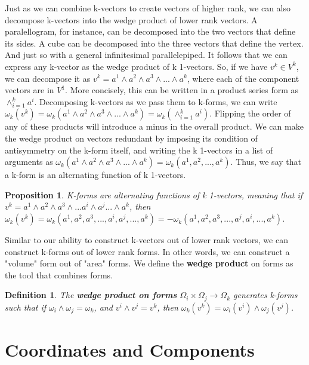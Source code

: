 \documentclass{book}
\newtheorem{defn}[equation]{Definition}
\newtheorem{prop}[equation]{Proposition}
\begin{document}
Just as we can combine k-vectors to create vectors of higher rank, we can also decompose k-vectors into the wedge product of lower rank vectors. A paralellogram, for instance, can be decomposed into the two vectors that define its sides. A cube can be decomposed into the three vectors that define the vertex. And just so with a general infinitesimal parallelepiped. It follows that we can express any k-vector as the wedge product of k 1-vectors. So, if we have $v^k \in V^k$, we can decompose it as $v^k = a^1\wedge a^2 \wedge a^3 \wedge ... \wedge a^k$, where each of the component vectors are in $V^1$. More concisely, this can be written in a product series form as $\wedge^k_{i=1} a^i$. Decomposing k-vectors as we pass them to k-forms, we can write $\omega_k(v^k) = \omega_k(a^1\wedge a^2 \wedge a^3 \wedge ... \wedge a^k) = \omega_k(\wedge^k_{i=1}a^i)$. Flipping the order of any of these products will introduce a minus in the overall product. We can make the wedge product on vectors redundant by imposing its condition of antisymmetry on the k-form itself, and writing the k 1-vectors in a list of arguments as $\omega_k(a^1\wedge a^2 \wedge a^3 \wedge ... \wedge a^k) = \omega_k(a^1, a^2, ..., a^k)$. Thus, we say that a k-form is an alternating function of k 1-vectors. 

\begin{prop}
	K-forms are alternating functions of k 1-vectors, meaning that if $v^k = a^1\wedge a^2 \wedge a^3 \wedge ... a^i \wedge a^j ... \wedge a^k$, then $\omega_k(v^k) = \omega_k(a^1, a^2, a^3, ..., a^i, a^j, ..., a^k) = -\omega_k(a^1, a^2, a^3, ..., a^j, a^i, ..., a^k)$. 
\end{prop}



Similar to our ability to construct k-vectors out of lower rank vectors, we can construct k-forms out of lower rank forms. In other words, we can construct a "volume" form out of "area" forms. We define the \textbf{wedge product} on forms as the tool that combines forms. 

\begin{defn}
	The \textbf{wedge product on forms} $\Omega_i \times \Omega_j \to \Omega_k$ generates k-forms such that if $\omega_i \wedge \omega_j = \omega_k$, and $v^i \wedge v^j = v^k$, then $\omega_k(v^k) = \omega_i(v^i) \wedge \omega_j(v^j)$. 
\end{defn}




\section{Coordinates and Components} 
\end{document}
